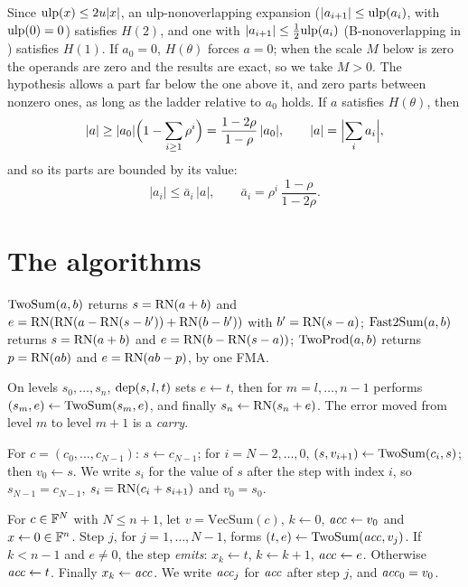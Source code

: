 Since $\mathrm{ulp}(x) \le 2u|x|$, an ulp-nonoverlapping expansion \cite{MPT16,BJMP17} ($|a_{i+1}| \le \mathrm{ulp}(a_i)$, with
$\mathrm{ulp}(0) = 0$) satisfies $H(2)$, and one with $|a_{i+1}| \le \frac12\mathrm{ulp}(a_i)$ (B-nonoverlapping in \cite{JMMP16})
satisfies $H(1)$. If $a_0 = 0$, $H(\theta)$ forces $a = 0$; when the scale $M$ below is zero the operands are zero and
the results are exact, so we take $M > 0$. The hypothesis allows a part far
below the one above it, and zero parts between nonzero ones, as long as the ladder relative to $a_0$ holds. If $a$
satisfies $H(\theta)$, then
\begin{equation}\label{eq:a0}
|a| \ge |a_0|\Bigl(1 - \sum_{i \ge 1}\rho^i\Bigr) = \frac{1-2\rho}{1-\rho}\,|a_0|, \qquad |a| = \Bigl|\sum_i a_i\Bigr|,
\end{equation}
and so its parts are bounded by its value:
\begin{equation}\label{eq:abar}
|a_i| \le \bar a_i\,|a|, \qquad \bar a_i = \rho^i\,\frac{1-\rho}{1-2\rho}.
\end{equation}

\section{The algorithms}

$\mathrm{TwoSum}(a, b)$ returns $s = \mathrm{RN}(a+b)$ and $e = \mathrm{RN}(\mathrm{RN}(a - \mathrm{RN}(s - b')) + \mathrm{RN}(b - b'))$ with $b' = \mathrm{RN}(s - a)$;
$\mathrm{Fast2Sum}(a, b)$ returns $s = \mathrm{RN}(a+b)$ and $e = \mathrm{RN}(b - \mathrm{RN}(s - a))$; $\mathrm{TwoProd}(a, b)$ returns $p = \mathrm{RN}(ab)$ and $e
= \mathrm{RN}(ab - p)$, by one FMA.

On levels $s_0, \dots, s_n$, $\mathrm{dep}(s, l, t)$ sets $e \gets t$, then for $m = l, \dots, n-1$ performs $(s_m, e) \gets
\mathrm{TwoSum}(s_m, e)$, and finally $s_n \gets \mathrm{RN}(s_n + e)$. The error moved from level $m$ to level $m+1$ is a \emph{carry}.

 For $c = (c_0, \dots, c_{N-1})$: $s \gets c_{N-1}$; for $i = N-2, \dots, 0$, $(s, v_{i+1}) \gets
\mathrm{TwoSum}(c_i, s)$; then $v_0 \gets s$. We write $s_i$ for the value of $s$ after the step with index $i$, so $s_{N-1} =
c_{N-1}$, $s_i = \mathrm{RN}(c_i + s_{i+1})$ and $v_0 = s_0$.

 For $c \in \mathbb{F}^N$ with $N \le n+1$, let $v = \mathrm{VecSum}(c)$, $k \gets 0$, $\mathit{acc}
\gets v_0$ and $x \gets 0 \in \mathbb{F}^n$. Step $j$, for $j = 1, \dots, N-1$, forms $(t, e) \gets \mathrm{TwoSum}(\mathit{acc}, v_j)$. If $k <
n-1$ and $e \ne 0$, the step \emph{emits}: $x_k \gets t$, $k \gets k+1$, $\mathit{acc} \gets e$. Otherwise $\mathit{acc} \gets t$.
Finally $x_k \gets \mathit{acc}$. We write $\mathit{acc}_j$ for $\mathit{acc}$ after step $j$, and $\mathit{acc}_0 = v_0$.

